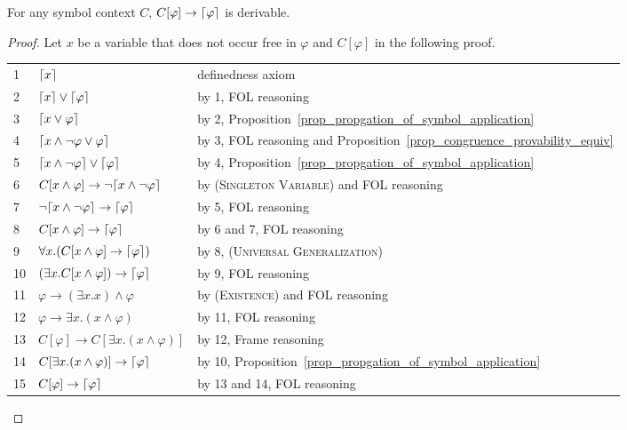\documentclass[acmsmall]{acmart}
\theoremstyle{acmdefinition}
\newcommand{\imp}{\to}
\newcommand{\Capp}[1]{C[#1]}
\newcommand{\prule}[1]{\textsc{(#1)}}
\newcommand{\universalgeneralization}{\prule{Universal Generalization}\xspace}
\newcommand{\existence}{\prule{Existence}\xspace}
\newcommand{\singletonvariable}{\prule{Singleton Variable}\xspace}
\newcommand{\eframing}{Frame reasoning\xspace}
\DeclarePairedDelimiter{\ceil}{\lceil}{\rceil}
\begin{document}
\begin{lemma}
\label{lemma_sigmacontext_implies_ceil}
For any symbol context $C$,
$\Capp{\varphi} \imp \ceil{\varphi}$
is derivable.
\end{lemma}
\begin{proof}
Let $x$ be a variable that does not occur free in $\varphi$
and $\Capp{\varphi}$ in the following proof.
\begin{center}
\begin{tabular}{l|ll}
1 & $\ceil{x}$
  & definedness axiom \\
2 & $\ceil{x} \vee \ceil{\varphi}$
  & by 1, FOL reasoning \\
3 & $\ceil{x \vee \varphi}$
  & by 2, Proposition~\ref{prop_propgation_of_symbol_application} \\
4 & $\ceil{x \wedge \neg \varphi \vee \varphi}$
  & by 3, FOL reasoning and 
          Proposition~\ref{prop_congruence_provability_equiv}\\
5 & $\ceil{x \wedge \neg \varphi} \vee \ceil{\varphi}$
  & by 4, Proposition~\ref{prop_propgation_of_symbol_application} \\
6 & $\Capp{x \wedge \varphi} \imp \neg \ceil{x \wedge \neg \varphi}$
  & by \singletonvariable and FOL reasoning \\
7 & $\neg \ceil{x \wedge \neg \varphi} \imp \ceil{\varphi}$
  & by 5, FOL reasoning \\
8 & $\Capp{x \wedge \varphi} \imp \ceil{\varphi}$
  & by 6 and 7, FOL reasoning \\
9 & $\forall x . (\Capp{x \wedge \varphi} \imp \ceil{\varphi})$
  & by 8, \universalgeneralization \\
10& $(\exists x . \Capp{x \wedge \varphi}) \imp \ceil{\varphi}$
  & by 9, FOL reasoning \\
11& $\varphi \imp (\exists x . x) \wedge \varphi$
  & by \existence and FOL reasoning \\
12& $\varphi \imp \exists x . (x \wedge \varphi)$
  & by 11, FOL reasoning \\
13& $\Capp{\varphi} \imp \Capp{\exists x . (x \wedge \varphi)}$ 
  & by 12, \eframing \\
14& $\Capp{\exists x . (x \wedge \varphi)} \imp \ceil{\varphi}$
  & by 10, Proposition~\ref{prop_propgation_of_symbol_application} \\
15& $\Capp{\varphi} \imp \ceil{\varphi}$
  & by 13 and 14, FOL reasoning
\end{tabular}
\end{center}
\end{proof}
\end{document}
